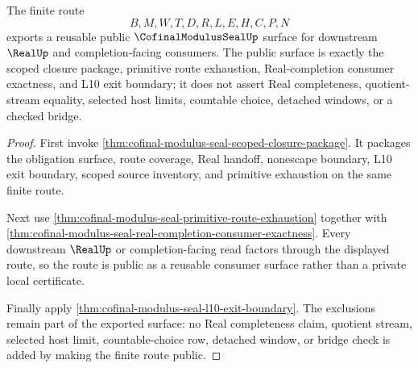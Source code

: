 \begin{theorem}
\label{thm:cofinal-modulus-seal-public-route-export}
The finite route
$$
B,M,W,T,D,R,L,E,H,C,P,N
$$
exports a reusable public $\CofinalModulusSealUp$ surface for downstream $\RealUp$ and completion-facing consumers. The public surface is exactly the scoped closure package, primitive route exhaustion, Real-completion consumer exactness, and L10 exit boundary; it does not assert Real completeness, quotient-stream equality, selected host limits, countable choice, detached windows, or a checked bridge.
\end{theorem}
\begin{proof}
First invoke \autoref{thm:cofinal-modulus-seal-scoped-closure-package}. It packages the obligation surface, route coverage, Real handoff, nonescape boundary, L10 exit boundary, scoped source inventory, and primitive exhaustion on the same finite route.

Next use \autoref{thm:cofinal-modulus-seal-primitive-route-exhaustion} together with \autoref{thm:cofinal-modulus-seal-real-completion-consumer-exactness}. Every downstream $\RealUp$ or completion-facing read factors through the displayed route, so the route is public as a reusable consumer surface rather than a private local certificate.

Finally apply \autoref{thm:cofinal-modulus-seal-l10-exit-boundary}. The exclusions remain part of the exported surface: no Real completeness claim, quotient stream, selected host limit, countable-choice row, detached window, or bridge check is added by making the finite route public.
\end{proof}

